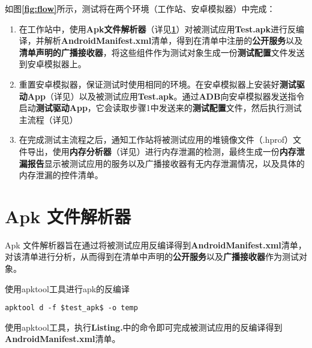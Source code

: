 如图\textbf{\textcolor{red}{\ref{fig:flow}}}所示，测试将在两个环境（工作站、安卓模拟器）中完成：
\begin{enumerate}
	\item 在工作站中，使用\textbf{Apk文件解析器}（详见\textbf{\textcolor{red}{\ref{apk analyser}}}）对被测试应用\textbf{Test.apk}进行反编译，并解析\textbf{AndroidManifest.xml}清单，得到在清单中注册的\textbf{公开服务}以及\textbf{清单声明的广播接收器}，将这些组件作为测试对象生成一份\textbf{测试配置}文件发送到安卓模拟器上。
	\item 重置安卓模拟器，保证测试时使用相同的环境。在安卓模拟器上安装好\textbf{测试驱动App}（详见\redbf{\ref{test driver app}}）以及被测试应用\textbf{Test.apk}。通过\textbf{ADB}向安卓模拟器发送指令启动\textbf{测试驱动App}，它会读取步骤1中发送来的\textbf{测试配置}文件，然后执行测试主流程（详见\redbf{\ref{main flow}}）
	\item 在完成测试主流程之后，通知工作站将被测试应用的堆镜像文件（.hprof）文件导出，使用\textbf{内存分析器}（详见\redbf{\ref{memory analyser}}）进行内存泄漏的检测，最终生成一份\textbf{内存泄漏报告}显示被测试应用的服务以及广播接收器有无内存泄漏情况，以及具体的内存泄漏的控件清单。
\end{enumerate}

\section{Apk 文件解析器}\label{apk analyser}
Apk 文件解析器旨在通过将被测试应用反编译得到\textbf{AndroidManifest.xml}清单，对该清单进行分析，从而得到在清单中声明的\textbf{公开服务}以及\textbf{广播接收器}作为测试对象。
\begin{listing}[htbp]
	\centering
	\caption{使用apktool工具进行apk的反编译}
	\begin{verbatim}
apktool d -f $test_apk$ -o temp
	\end{verbatim}
	\label{shell:apktool}
\end{listing}

使用apktool工具\cite{apktool}，执行\textbf{Listing.}\redbf{\ref{shell:apktool}}中的命令即可完成被测试应用的反编译得到\textbf{AndroidManifest.xml}清单。

